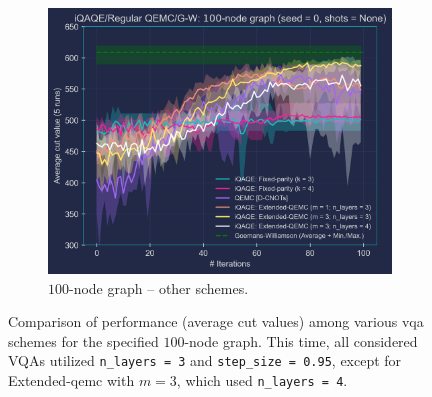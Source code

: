 \begin{figure}[hb!]
\begin{subfigure}[b]{0.495\textwidth}
        \includegraphics[width=1\textwidth, height=0.812\textwidth]{Figures/Chapter_5/Large graphs/100-node_Graph_seed=0.png}
        \caption{$100$-node graph – other schemes.}
        \label{fig:100-node_Graph}
    \end{subfigure}
    \caption{Comparison of performance (average cut values) among various \acrshort{vqa} schemes for the specified $100$-node graph. This time, all considered VQAs utilized \texttt{n\_layers = 3} and \texttt{step\_size = 0.95}, except for Extended-\acrshort{qemc} with $m=3$, which used \texttt{n\_layers = 4}.}
    \label{fig:100-node_Graph(2-Subfigures)}
\end{figure}



